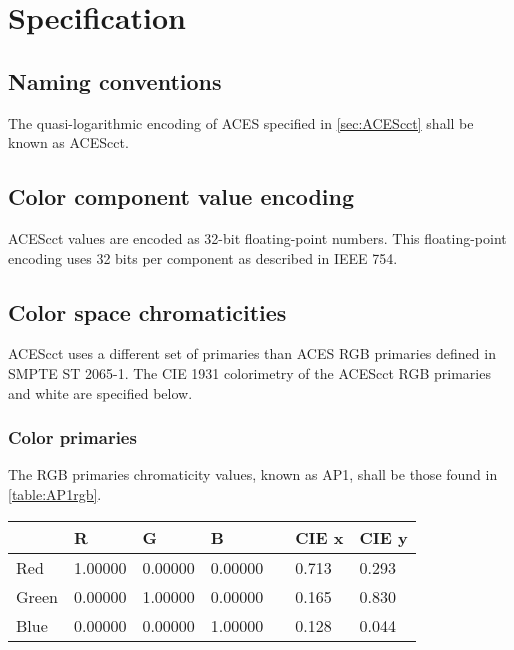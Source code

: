 \regularsectionformat	%
\chapter{Specification}

\section{Naming conventions}
The quasi-logarithmic encoding of ACES specified in \autoref{sec:ACEScct} shall be known as ACEScct.

\section{Color component value encoding}
ACEScct values are encoded as 32-bit floating-point numbers. This floating-point encoding uses 32 bits per component as described in IEEE 754.

\section{Color space chromaticities}
\label{sec:colorspace}
ACEScct uses a different set of primaries than ACES RGB primaries defined in SMPTE ST 2065-1. The CIE 1931 colorimetry of the ACEScct RGB primaries and white are specified below.

\subsection{Color primaries}
The RGB primaries chromaticity values, known as AP1, shall be those found in \autoref{table:AP1rgb}.

\begin{center}
\begin{tabularx}{4.5in}{XlllXll}
        & R       & G       & B       & & CIE x & CIE y \\ \hline
Red     & 1.00000 & 0.00000 & 0.00000 & & 0.713 & 0.293 \\
Green   & 0.00000 & 1.00000 & 0.00000 & & 0.165 & 0.830 \\
Blue    & 0.00000 & 0.00000 & 1.00000 & & 0.128 & 0.044 \\
\end{tabularx}
\label{table:AP1rgb}
\end{center}

